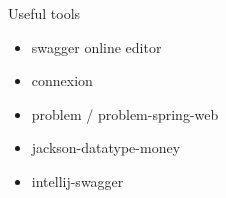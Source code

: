 \documentclass[10pt]{beamer}
\begin{document}
\begin{frame}{Useful tools}
  \begin{itemize}
    \item swagger online editor
    \item connexion
    \item problem / problem-spring-web
    \item jackson-datatype-money
    \item intellij-swagger
  \end{itemize}
\end{frame}
\end{document}
